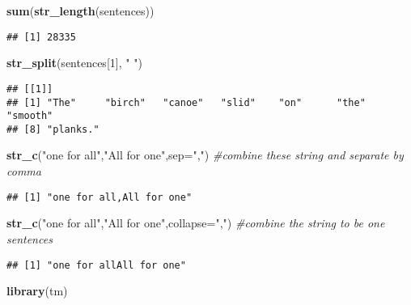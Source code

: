 \documentclass[
]{article}
\newenvironment{Shaded}{\begin{snugshade}}{\end{snugshade}}
\newcommand{\AttributeTok}[1]{\textcolor[rgb]{0.13,0.29,0.53}{#1}}
\newcommand{\CommentTok}[1]{\textcolor[rgb]{0.56,0.35,0.01}{\textit{#1}}}
\newcommand{\DecValTok}[1]{\textcolor[rgb]{0.00,0.00,0.81}{#1}}
\newcommand{\FunctionTok}[1]{\textcolor[rgb]{0.13,0.29,0.53}{\textbf{#1}}}
\newcommand{\NormalTok}[1]{#1}
\newcommand{\StringTok}[1]{\textcolor[rgb]{0.31,0.60,0.02}{#1}}
\begin{document}
\begin{Shaded}
\begin{Highlighting}[]
\FunctionTok{sum}\NormalTok{(}\FunctionTok{str\_length}\NormalTok{(sentences))}
\end{Highlighting}
\end{Shaded}

\begin{verbatim}
## [1] 28335
\end{verbatim}

\begin{Shaded}
\begin{Highlighting}[]
\FunctionTok{str\_split}\NormalTok{(sentences[}\DecValTok{1}\NormalTok{], }\StringTok{" "}\NormalTok{)}
\end{Highlighting}
\end{Shaded}

\begin{verbatim}
## [[1]]
## [1] "The"     "birch"   "canoe"   "slid"    "on"      "the"     "smooth" 
## [8] "planks."
\end{verbatim}

\begin{Shaded}
\begin{Highlighting}[]
\FunctionTok{str\_c}\NormalTok{(}\StringTok{"one for all"}\NormalTok{,}\StringTok{"All for one"}\NormalTok{,}\AttributeTok{sep=}\StringTok{","}\NormalTok{) }\CommentTok{\#combine these string and separate by comma}
\end{Highlighting}
\end{Shaded}

\begin{verbatim}
## [1] "one for all,All for one"
\end{verbatim}

\begin{Shaded}
\begin{Highlighting}[]
\FunctionTok{str\_c}\NormalTok{(}\StringTok{"one for all"}\NormalTok{,}\StringTok{"All for one"}\NormalTok{,}\AttributeTok{collapse=}\StringTok{","}\NormalTok{) }\CommentTok{\#combine the string to be one sentences}
\end{Highlighting}
\end{Shaded}

\begin{verbatim}
## [1] "one for allAll for one"
\end{verbatim}

\begin{Shaded}
\begin{Highlighting}[]
\FunctionTok{library}\NormalTok{(tm)}
\end{Highlighting}
\end{Shaded}
\end{document}
